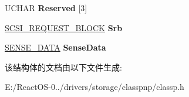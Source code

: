 \begin{DoxyCompactItemize}
\mbox{\label{struct___c_l_a_s_s___e_r_r_o_r___l_o_g___d_a_t_a_a11299d8aedbbd206b6a77758a4e8d460}} 
U\+C\+H\+AR {\bfseries Reserved} \mbox{[}3\mbox{]}
\item 
\mbox{\label{struct___c_l_a_s_s___e_r_r_o_r___l_o_g___d_a_t_a_a9e77c33d2a911da3aa1da87401fab70f}} 
\hyperlink{struct___s_c_s_i___r_e_q_u_e_s_t___b_l_o_c_k}{S\+C\+S\+I\+\_\+\+R\+E\+Q\+U\+E\+S\+T\+\_\+\+B\+L\+O\+CK} {\bfseries Srb}
\item 
\mbox{\label{struct___c_l_a_s_s___e_r_r_o_r___l_o_g___d_a_t_a_a3d66266a213c6ad0f0b966adc5319f9b}} 
\hyperlink{struct___s_e_n_s_e___d_a_t_a}{S\+E\+N\+S\+E\+\_\+\+D\+A\+TA} {\bfseries Sense\+Data}
\end{DoxyCompactItemize}


该结构体的文档由以下文件生成\+:\begin{DoxyCompactItemize}
\item 
E\+:/\+React\+O\+S-\/0../drivers/storage/classpnp/classp.\+h\end{DoxyCompactItemize}
